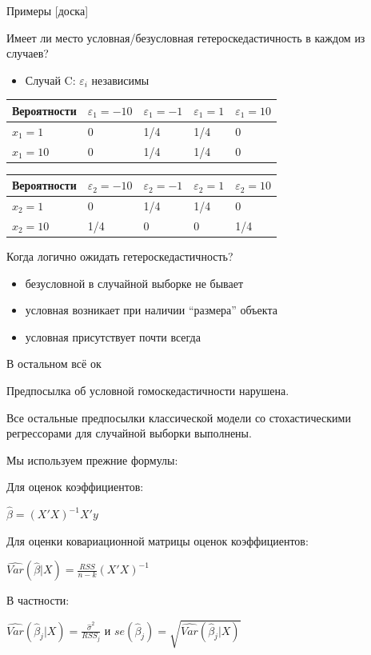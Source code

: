 \documentclass[ignorenonframetext,]{beamer}
\newcommand{\e}{\varepsilon}
\begin{document}
\begin{frame}{Примеры {[}доска{]}}

Имеет ли место условная/безусловная гетероскедастичность в каждом из
случаев?

\begin{itemize}
\itemsep1pt\parskip0pt
\item
  Случай C: \(\e_i\) независимы
\end{itemize}

\begin{longtable}[c]{@{}lllll@{}}
\toprule
Вероятности & \(\e_1=-10\) & \(\e_1=-1\) & \(\e_1=1\) &
\(\e_1=10\)\tabularnewline
\midrule
\endhead
\(x_1=1\) & 0 & 1/4 & 1/4 & 0\tabularnewline
\(x_1=10\) & 0 & 1/4 & 1/4 & 0\tabularnewline
\bottomrule
\end{longtable}

\begin{longtable}[c]{@{}lllll@{}}
\toprule
Вероятности & \(\e_2=-10\) & \(\e_2=-1\) & \(\e_2=1\) &
\(\e_2=10\)\tabularnewline
\midrule
\endhead
\(x_2=1\) & 0 & 1/4 & 1/4 & 0\tabularnewline
\(x_2=10\) & 1/4 & 0 & 0 & 1/4\tabularnewline
\bottomrule
\end{longtable}

\end{frame}

\begin{frame}{Когда логично ожидать гетероскедастичность?}

\begin{itemize}
\item
  безусловной в случайной выборке не бывает
\item
  условная возникает при наличии ``размера'' объекта
\item
  условная присутствует почти всегда
\end{itemize}

\end{frame}

\begin{frame}{В остальном всё ок}

Предпосылка об условной гомоскедастичности нарушена.

Все остальные предпосылки классической модели со стохастическими
регрессорами для случайной выборки выполнены.

\end{frame}

\begin{frame}{Мы используем прежние формулы:}

Для оценок коэффициентов:

\(\hat{\beta}=(X'X)^{-1}X'y\)

Для оценки ковариационной матрицы оценок коэффициентов:

\(\widehat{Var}(\hat{\beta}|X)=\frac{RSS}{n-k}(X'X)^{-1}\)

В частности:

\(\widehat{Var}(\hat{\beta}_j|X)=\frac{\hat{\sigma}^2}{RSS_j}\) и
\(se(\hat{\beta}_j)=\sqrt{\widehat{Var}(\hat{\beta}_j|X)}\)

\end{frame}
\end{document}
